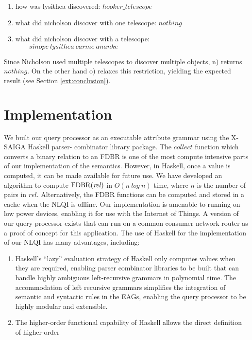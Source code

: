 \documentclass[../main.tex]{subfiles}
\begin{document}
\begin{refsection}
\begin{enumerate}[label=\alph*.]
	\item how was lysithea discovered: $\mathit{hooker\_telescope}$
	\item what did nicholson discover with one telescope: $\mathit{nothing}$
	\item what did nicholson discover with a telescope: \\ $\mathit{\qquad sinope\ lysithea\ carme\ ananke}$
\end{enumerate}
%
Since Nicholson used multiple telescopes to discover multiple objects, n) returns $\mathit{nothing}$. On the other hand o) relaxes this restriction, yielding the expected result (see Section \ref{ext:conclusion}).

\section{Implementation}
\label{ext:implementation}
We built our query processor as an executable attribute grammar using the X-SAIGA Haskell parser-
combinator library package. %
The $\mathit{collect}$ function which converts a binary relation to an FDBR is one of the most
compute intensive parts of our implementation of the semantics. However, in Haskell, once a value is
computed, it can be made available for future use. We have developed an algorithm to compute
$\mathrm{FDBR}({\mathit{rel}})$ in $O(n\ log\ n)$ time, where $n$ is the number of pairs in $\mathit{rel}$.
Alternatively, the FDBR functions can be computed and stored in a cache when the NLQI is offline.
Our implementation is amenable to running on low power devices, enabling it for use with the Internet of Things. A version of our query processor exists that can run on a common consumer network router as a proof of concept for this application.
The use of Haskell for the implementation of our NLQI has many advantages, including:
\begin{enumerate}
	\setlength\itemsep{0em}
	\item Haskell's ``lazy'' evaluation strategy of Haskell only computes values when they are required, enabling parser combinator
	libraries to be built that can handle highly ambiguous left-recursive grammars in polynomial time. The accommodation of left recursive
	grammars simplifies the integration of semantic and syntactic rules in the EAGs, enabling the query processor to be highly modular and extensible.
	\item The higher-order functional capability of Haskell allows the direct definition of higher-order

\end{enumerate}
\end{refsection}
\end{document}
